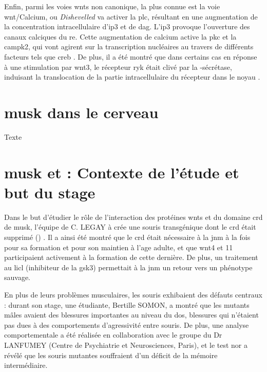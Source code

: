 Enfin, parmi les voies \glspl{wnt} non canonique, la plus connue est la voie \Gls{wnt}/Calcium, ou \emph{Dishevelled} va activer la \acrshort{plc}, résultant en une augmentation de la concentration intracellulaire d'\acrshort{ip3} et de \acrshort{dag}. L'\acrshort{ip3} provoque l'ouverture des canaux calciques du \gls{re}. Cette augmentation de calcium active la \acrshort{pkc} et la \acrshort{campk2}, qui vont agirent sur la transcription nucléaires au travers de différents facteurs tels que \acrshort{creb} \cite{Koles2012}. De plus, il a été montré que dans certains cas en réponse à une stimulation par \Gls{wnt}3, le récepteur \gls{ryk} était clivé par la \textgamma{}-sécrétase, induisant la translocation de la partie intracellulaire du récepteur dans le noyau \cite{Lyu2008}.

\section{\acrshort{musk} dans le cerveau}
\label{sec:MuSKCerveau}

Texte

\section{\acrshort{musk} et  : Contexte de l'étude et but du stage}
\label{sec:Contexte}

Dans le but d'étudier le rôle de l'interaction des protéines \Glspl{wnt} et du domaine \gls{crd} de \gls{musk}, l'équipe de C. LEGAY à crée une souris transgénique dont le \gls{crd} était supprimé (\mcrd) \cite{Messeant2015, Messeant2017}. Il a ainsi été montré que le \gls{crd} était nécessaire à la \gls{jnm} à la fois pour sa formation et pour son maintien à l'age adulte, et que \Gls{wnt}4 et 11 participaient activement à la formation de cette dernière. De plus, un traitement au \gls{licl} (inhibiteur de la \gls{gsk3}) permettait à la \gls{jnm} un retour vers un phénotype sauvage. 

En plus de leurs problèmes musculaires, les souris \mcrd exhibaient des défauts centraux : durant son stage, une étudiante, Bertille SOMON, a montré que les mutants mâles avaient des blessures importantes au niveau du dos, blessures qui n'étaient pas dues à des comportements d'agressivité entre souris. De plus, une analyse comportementale a été réalisée en collaboration avec le groupe du Dr LANFUMEY (Centre de Psychiatrie et Neurosciences, Paris), et le test \gls{nor} a révélé que les souris mutantes souffraient d'un déficit de la mémoire intermédiaire.

